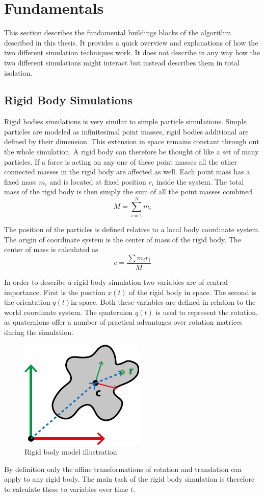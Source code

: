 \chapter{Fundamentals}
\label{cha:fundamentals}

This section describes the fundamental buildings blocks of the algorithm described in this thesis. It provides a quick overview and explanations of how the two different simulation techniques work. It does not describe in any way how the two different simulations might interact but instead describes them in total isolation.

\section{Rigid Body Simulations}
\label{sec:rigid_body_simulations}

Rigid bodies simulations is very similar to simple particle simulations. Simple particles are modeled as infinitesimal point masses, rigid bodies additional are defined by their dimension. This extension in space remains constant through out the whole simulation. A rigid body can therefore be thought of like a set of many particles. If a force is acting on any one of these point masses all the other connected masses in the rigid body are affected as well. Each point mass has a fixed mass $m_i$ and is located at fixed position $r_i$ inside the system. The total mass of the rigid body is then simply the sum of all the point masses combined
\[
M = \sum\limits_{i=1}^N m_i
\]

The position of the particles is defined relative to a local body coordinate system. The origin of coordinate system is the center of mass of the rigid body. The center of mass is calculated as 
\[
c = \frac{\sum m_i r_i}{M}
\]

In order to describe a rigid body simulation two variables are of central importance. First is the position \(x(t)\) of the rigid body in space. The second is the orientation \(q(t)\)in space. Both these variables are defined in relation to the world coordinate system. The quaternion \(q(t)\) is used to represent the rotation, as quaternions offer a number of practical advantages over rotation matrices during the simulation.
\begin{figure}[htbp]
\centering
\includegraphics[scale=0.55]{images/rigid_body_1.png}
\caption{Rigid body model illustration}
\label{img:rigid_body}
\end{figure}
By definition only the affine transformations of rotation and translation can apply to any rigid body. The main task of the rigid body simulation is therefore to calculate these to variables over time \(t\).

